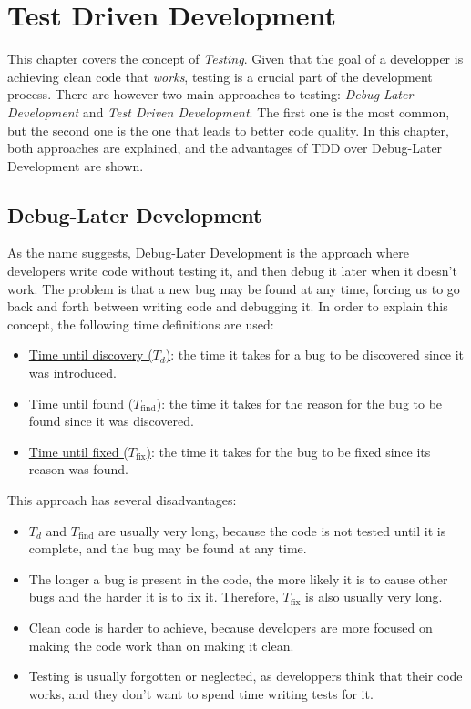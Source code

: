 \chapter{Test Driven Development}

This chapter covers the concept of \emph{Testing}. Given that the goal of a developper is achieving clean code that \emph{works}, testing is a crucial part of the development process. There are however two main approaches to testing: \emph{Debug-Later Development} and \emph{Test Driven Development}. The first one is the most common, but the second one is the one that leads to better code quality. In this chapter, both approaches are explained, and the advantages of TDD over Debug-Later Development are shown.

\section{Debug-Later Development}

As the name suggests, Debug-Later Development is the approach where developers write code without testing it, and then debug it later when it doesn't work. The problem is that a new bug may be found at any time, forcing us to go back and forth between writing code and debugging it. In order to explain this concept, the following time definitions are used:
\begin{itemize}
    \item \ul{Time until discovery ($T_d$)}: the time it takes for a bug to be discovered since it was introduced.
    \item \ul{Time until found ($T_{\text{find}}$)}: the time it takes for the reason for the bug to be found since it was discovered.
    \item \ul{Time until fixed ($T_{\text{fix}}$)}: the time it takes for the bug to be fixed since its reason was found.
\end{itemize}

This approach has several disadvantages:
\begin{itemize}
    \item $T_d$ and $T_{\text{find}}$ are usually very long, because the code is not tested until it is complete, and the bug may be found at any time.
    \item The longer a bug is present in the code, the more likely it is to cause other bugs and the harder it is to fix it. Therefore, $T_{\text{fix}}$ is also usually very long.
    \item Clean code is harder to achieve, because developers are more focused on making the code work than on making it clean.
    \item Testing is usually forgotten or neglected, as developpers think that their code works, and they don't want to spend time writing tests for it.
\end{itemize}

